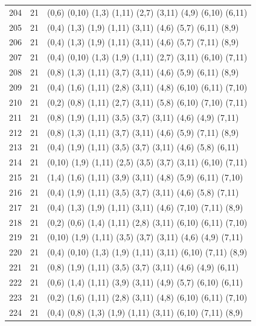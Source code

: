 \begin{appendix}
{\begin{longtable}{lll}
    204& 21 & (0,6)   (0,10)  (1,3)   (1,11)  (2,7)   (3,11)  (4,9)   (6,10)  (6,11)\\
    205& 21 & (0,4)   (1,3)   (1,9)   (1,11)  (3,11)  (4,6)   (5,7)   (6,11)  (8,9)\\
    206& 21 & (0,4)   (1,3)   (1,9)   (1,11)  (3,11)  (4,6)   (5,7)   (7,11)  (8,9)\\
    207& 21 & (0,4)   (0,10)  (1,3)   (1,9)   (1,11)  (2,7)   (3,11)  (6,10)  (7,11)\\
    208& 21 & (0,8)   (1,3)   (1,11)  (3,7)   (3,11)  (4,6)   (5,9)   (6,11)  (8,9)\\
    209& 21 & (0,4)   (1,6)   (1,11)  (2,8)   (3,11)  (4,8)   (6,10)  (6,11)  (7,10)\\
    210& 21 & (0,2)   (0,8)   (1,11)  (2,7)   (3,11)  (5,8)   (6,10)  (7,10)  (7,11)\\
    211& 21 & (0,8)   (1,9)   (1,11)  (3,5)   (3,7)   (3,11)  (4,6)   (4,9)   (7,11)\\
    212& 21 & (0,8)   (1,3)   (1,11)  (3,7)   (3,11)  (4,6)   (5,9)   (7,11)  (8,9)\\
    213& 21 & (0,4)   (1,9)   (1,11)  (3,5)   (3,7)   (3,11)  (4,6)   (5,8)   (6,11)\\
    214& 21 & (0,10)  (1,9)   (1,11)  (2,5)   (3,5)   (3,7)   (3,11)  (6,10)  (7,11)\\
    215& 21 & (1,4)   (1,6)   (1,11)  (3,9)   (3,11)  (4,8)   (5,9)   (6,11)  (7,10)\\
    216& 21 & (0,4)   (1,9)   (1,11)  (3,5)   (3,7)   (3,11)  (4,6)   (5,8)   (7,11)\\
    217& 21 & (0,4)   (1,3)   (1,9)   (1,11)  (3,11)  (4,6)   (7,10)  (7,11)  (8,9)\\
    218& 21 & (0,2)   (0,6)   (1,4)   (1,11)  (2,8)   (3,11)  (6,10)  (6,11)  (7,10)\\
    219& 21 & (0,10)  (1,9)   (1,11)  (3,5)   (3,7)   (3,11)  (4,6)   (4,9)   (7,11)\\
    220& 21 & (0,4)   (0,10)  (1,3)   (1,9)   (1,11)  (3,11)  (6,10)  (7,11)  (8,9)\\
    221& 21 & (0,8)   (1,9)   (1,11)  (3,5)   (3,7)   (3,11)  (4,6)   (4,9)   (6,11)\\
    222& 21 & (0,6)   (1,4)   (1,11)  (3,9)   (3,11)  (4,9)   (5,7)   (6,10)  (6,11)\\
    223& 21 & (0,2)   (1,6)   (1,11)  (2,8)   (3,11)  (4,8)   (6,10)  (6,11)  (7,10)\\
    224& 21 & (0,4)   (0,8)   (1,3)   (1,9)   (1,11)  (3,11)  (6,10)  (7,11)  (8,9)\\

\end{longtable}}
\end{appendix}
